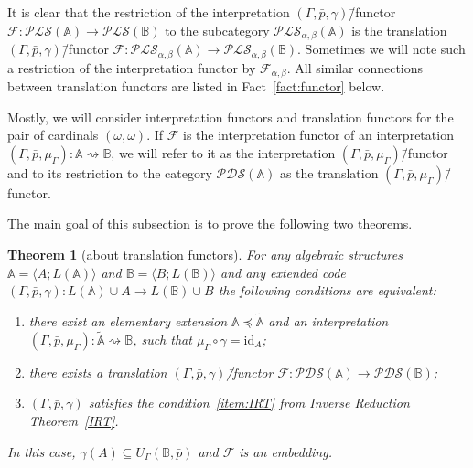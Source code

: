 \documentclass[12pt]{article}
\newtheorem{theorem}{Theorem}
\theoremstyle{definition}
\def\MA{{\mathbb{A}}}
\def\MB{{\mathbb{B}}}
\newcommand{\nsA}{\widetilde{\mathbb A}}
\def\F{{\mathcal{F}}}
\def\PLS{{\mathcal{PLS}}}
\def\PDS{{\mathcal{PDS}}}
\def\id{{\mathrm{id}}}
\begin{document}
It is clear that the restriction of the interpretation $(\Gamma,\bar p,\gamma)$\=/functor $\F\colon \PLS(\MA)\to\PLS(\MB)$ to the subcategory $\PLS_{\alpha,\beta}(\MA)$ is the translation $(\Gamma,\bar p,\gamma)$\=/functor $\F\colon \PLS_{\alpha,\beta}(\MA)\to\PLS_{\alpha,\beta}(\MB)$. Sometimes we will note such a restriction of the interpretation functor by $\F_{\alpha,\beta}$. All similar connections between translation functors are listed in Fact~\ref{fact:functor} below.

Mostly, we will consider interpretation functors and translation functors for the pair of cardinals $(\omega,\omega)$. If $\F$ is the interpretation functor of an interpretation $(\Gamma,\bar p,\mu_\Gamma)\colon\MA\rightsquigarrow\MB$, we will refer to it as the interpretation $(\Gamma,\bar p,\mu_\Gamma)$\=/functor and to its restriction to the category $\PDS(\MA)$ as the translation $(\Gamma,\bar p,\mu_\Gamma)$\=/functor.

The main goal of this subsection is to prove the following two theorems.

\begin{theorem}[about translation functors]\label{th:functor1}
For any algebraic structures $\MA=\langle A; L(\MA)\rangle$ and $\MB=\langle B; L(\MB)\rangle$ and any extended code $(\Gamma,\bar p,\gamma)\colon L(\MA)\cup A\to L(\MB)\cup B$ the following conditions are equivalent:
    \begin{enumerate}[label=(\arabic*)]
        \item\label{item:t1} there exist an elementary extension $\MA\preceq\nsA$ and an interpretation $(\Gamma,\bar p, \mu_\Gamma)\colon \nsA\rightsquigarrow\MB$, such that $\mu_\Gamma \circ\gamma=\id_A$;
        \item\label{item:t2} there exists a translation $(\Gamma,\bar p,\gamma)$\=/functor $\F\colon\PDS(\MA)\to \PDS(\MB)$;
        \item\label{item:t3} $(\Gamma,\bar p,\gamma)$ satisfies the condition~\ref{item:IRT} from Inverse Reduction Theorem~\ref{IRT}.
    \end{enumerate}
In this case, $\gamma(A)\subseteq U_\Gamma(\MB,\bar p)$ and $\F$ is an embedding.
\end{theorem}
\end{document}
